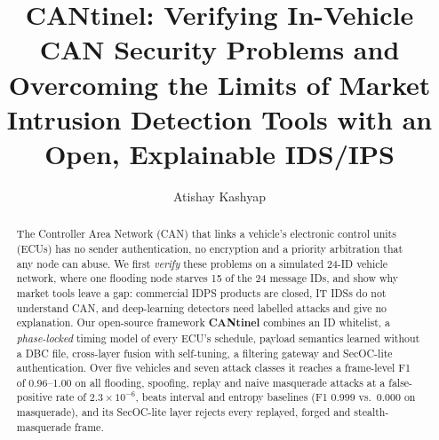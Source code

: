 \documentclass[runningheads]{llncs}
\begin{document}
\title{CANtinel: Verifying In-Vehicle CAN Security Problems and Overcoming the Limits of Market Intrusion Detection Tools with an Open, Explainable IDS/IPS}

\author{Atishay Kashyap}

\maketitle

\begin{abstract}
The Controller Area Network (CAN) that links a vehicle's electronic control units (ECUs) has no sender
authentication, no encryption and a priority arbitration that any node can abuse. We first \emph{verify} these
problems on a simulated 24-ID vehicle network, where one flooding node starves 15 of the 24 message IDs, and show why
market tools leave a gap: commercial IDPS products are closed, IT IDSs do not understand CAN, and deep-learning
detectors need labelled attacks and give no explanation. Our open-source framework \textbf{CANtinel} combines an ID whitelist, a
\emph{phase-locked} timing model of every ECU's schedule, payload semantics learned without a DBC file, cross-layer
fusion with self-tuning, a filtering gateway and SecOC-lite authentication. Over five vehicles and seven attack classes
it reaches a frame-level F1 of 0.96--1.00 on all flooding, spoofing, replay and naive masquerade attacks at a
false-positive rate of $2.3\times10^{-6}$, beats interval and entropy baselines (F1 0.999 vs.\ 0.000 on masquerade),
and its SecOC-lite layer rejects every replayed, forged and stealth-masquerade frame.
\end{abstract}

\end{document}
